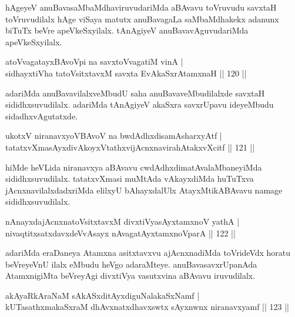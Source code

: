 \begin{artha}
hAgeyeV anuBavasaMbaMdhaviruvudariMda aBAvavu toVruvudu savxtaH toVruvudilalx hAge viSaya matutx anuBavagaLa saMbaMdhakekx adanunx biTuTx beVre apeVkeSxyilalx. tAnAgiyeV anuBavavAguvudariMda apeVkeSxyilalx.
\end{artha}

\begin{shl}
atoV\s vagatayxBAvoV\s pi na savxtoV\s vagatiM vinA |\\
sidhayxtiVha tatoV\s sitxtavxM savxta EvAkaSxrAtamxnaH \hfill || 120 ||
\end{shl}

\begin{artha}
adariMda anuBavavilalxveMbudU saha anuBavaveMbudilalxde savxtaH sididhxsuvu\-dilalx. adariMda tAnAgiyeV akaSxra savxrUpavu ideyeMbudu sidadhxvAgutatxde.
\end{artha}

\begin{shl}
ukotxV niranavxyoV\s BAvoV na bwdAdhxdisamAsharxyAtf |\\
tatatxvXmasAyxdivAkoyxVtathxvijAcnxnavirahAtakxvXcitf \hfill || 121 ||
\end{shl}

\begin{artha}%
hiMde heVLida niranavxya aBAvavu cwdAdhxdimatAvalaMbaneyiMda sididhxsu\-vudilalx. tatatxvXmasi muMtAda vAkayxdiMda huTuTxva jAcnxnavilalxdadxriMda elilxyU bAhayxdalUlx AtayxMtikABAvavu namage sididhxsuvudilalx.
\end{artha}

\begin{shl}
nAnayxdajAcnxnatoV\s sitxtavxM divxtiVyasAyx\s \s tamxnoV yathA  |\\
nivaqtitxsatxdavxdeVvAsayx nAvagatAyxtamxnoV\s parA \hfill || 122 ||
\end{shl}

\begin{artha}
adariMda eraDaneya Atamxna asitxtavxvu ajAcnxnadiMda toVrideVdx horatu beVreyeVnU ilalx eMbudu heVgo adaraMteye. anuBavasavxrUpanAda AtamxnigiMta beVreyAgi divxtiVya vasutxvina aBAvavu iruvudilalx.
\end{artha}

\begin{shl}
akAyaRkAraNaM sAkASxditAyxdiguNalakaSxNamf |\\
kUTasathxmakaSxraM dhAvxnatxdhavxswtx sAyxnwnx niranavxyamf \hfill || 123 ||
\end{shl}

